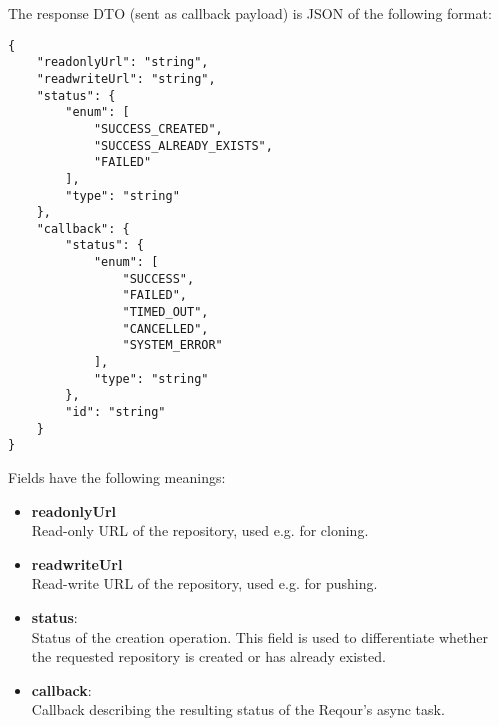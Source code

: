 \documentclass[../main.tex]{subfiles}
\begin{document}
The response DTO (sent as callback payload) is JSON of the following format:
\begin{lstlisting}[numbers=none]
{
    "readonlyUrl": "string",
    "readwriteUrl": "string",
    "status": {
        "enum": [
            "SUCCESS_CREATED",
            "SUCCESS_ALREADY_EXISTS",
            "FAILED"
        ],
        "type": "string"
    },
    "callback": {
        "status": {
            "enum": [
                "SUCCESS",
                "FAILED",
                "TIMED_OUT",
                "CANCELLED",
                "SYSTEM_ERROR"
            ],
            "type": "string"
        },
        "id": "string"
    }
}
\end{lstlisting}

Fields have the following meanings:
\begin{itemize}
    \item \textbf{readonlyUrl}\\
    Read-only URL of the repository, used e.g. for cloning.

    \item \textbf{readwriteUrl}\\
    Read-write URL of the repository, used e.g. for pushing.

    \item \textbf{status}:\\
    Status of the creation operation. This field is used to differentiate whether the requested repository is created or has already existed.

    \item \textbf{callback}:\\
    Callback describing the resulting status of the Reqour's async task.
\end{itemize}
\end{document}
